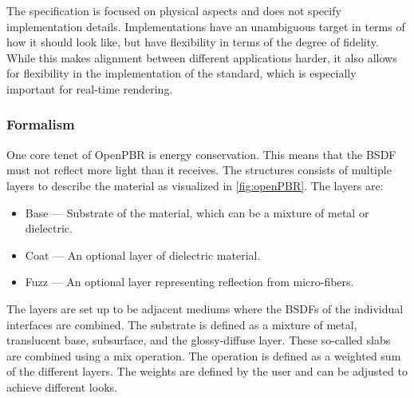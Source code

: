 The specification is focused on physical aspects and does not specify implementation details. Implementations have an unambiguous target in terms of how it should look like, but have flexibility in terms of the degree of fidelity. While this makes alignment between different applications harder, it also allows for flexibility in the implementation of the standard, which is especially important for real-time rendering.

\subsubsection{Formalism}

One core tenet of \gls{OpenPBR} is energy conservation. This means that the \gls{BSDF} must not reflect more light than it receives. The structures consists of multiple layers to describe the material as visualized in \autoref{fig:openPBR}. The layers are:

\begin{itemize}
  \item{Base} — Substrate of the material, which can be a mixture of metal or dielectric.
  \item{Coat} — An optional layer of dielectric material.
  \item{Fuzz} — An optional layer representing reflection from micro-fibers.
\end{itemize}

The layers are set up to be adjacent mediums where the \glspl{BSDF} of the individual interfaces are combined. The substrate is defined as a mixture of metal, translucent base, subsurface, and the glossy-diffuse layer. These so-called slabs are combined using a mix operation. The operation is defined as a weighted sum of the different layers. The weights are defined by the user and can be adjusted to achieve different looks.

